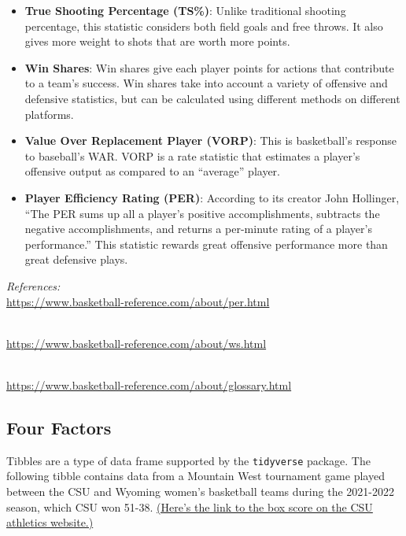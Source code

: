 \documentclass[
  11pt,
]{book}
\theoremstyle{definition}
\theoremstyle{definition}
\theoremstyle{definition}
\theoremstyle{definition}
\theoremstyle{remark}
\begin{document}
\begin{itemize}
\item
  \textbf{True Shooting Percentage (TS\%)}: Unlike traditional shooting percentage, this statistic considers both field goals and free throws. It also gives more weight to shots that are worth more points.
\item
  \textbf{Win Shares}: Win shares give each player points for actions that contribute to a team's success. Win shares take into account a variety of offensive and defensive statistics, but can be calculated using different methods on different platforms.
\item
  \textbf{Value Over Replacement Player (VORP)}: This is basketball's response to baseball's WAR. VORP is a rate statistic that estimates a player's offensive output as compared to an ``average'' player.
\item
  \textbf{Player Efficiency Rating (PER)}: According to its creator John Hollinger,
  ``The PER sums up all a player's positive accomplishments, subtracts the negative accomplishments, and returns a per-minute rating of a player's performance.'' This statistic rewards great offensive performance more than great defensive plays.
\end{itemize}

\emph{References:}\\
\url{https://www.basketball-reference.com/about/per.html}\strut \\
\url{https://www.basketball-reference.com/about/ws.html}\strut \\
\url{https://www.basketball-reference.com/about/glossary.html}

\hypertarget{four-factors}{%
\subsection{Four Factors}\label{four-factors}}

Tibbles are a type of data frame supported by the \texttt{tidyverse} package. The following tibble contains data from a Mountain West tournament game played between the CSU and Wyoming women's basketball teams during the 2021-2022 season, which CSU won 51-38. \href{https://csurams.com/sports/womens-basketball/stats/2021-22/wyoming/boxscore/16095}{(Here's the link to the box score on the CSU athletics website.)}
\end{document}
